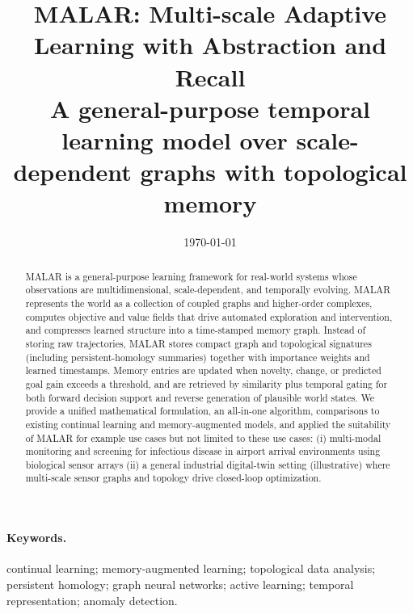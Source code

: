 \documentclass[11pt,english]{article}
\title{\textbf{MALAR}: Multi-scale Adaptive Learning with Abstraction and Recall\\
\large A general-purpose temporal learning model over scale-dependent graphs with topological memory}
\date {\today}
\theoremstyle{remark}
\begin{document}
\maketitle

\begin{abstract}
MALAR is a general-purpose learning framework for real-world systems whose observations are multidimensional,
scale-dependent, and temporally evolving. MALAR represents the world as a collection of coupled graphs and
higher-order complexes, computes objective and value fields that drive automated exploration and intervention,
and compresses learned structure into a time-stamped memory graph. Instead of storing raw trajectories,
MALAR stores compact graph and topological signatures (including persistent-homology summaries) together with
importance weights and learned timestamps. Memory entries are updated when novelty, change, or predicted goal
gain exceeds a threshold, and are retrieved by similarity plus temporal gating for both forward decision support
and reverse generation of plausible world states. We provide a unified mathematical formulation, an all-in-one
algorithm, comparisons to existing continual learning and memory-augmented models, and applied the suitability of MALAR for example use cases but not limited to these use cases: (i) multi-modal monitoring and screening for infectious disease in airport arrival environments using biological
sensor arrays (ii) a general industrial digital-twin setting (illustrative) where multi-scale
sensor graphs and topology drive closed-loop optimization.
\end{abstract}

\paragraph{Keywords.} continual learning; memory-augmented learning; topological data analysis; persistent homology; graph neural networks; active learning; temporal representation; anomaly detection.
\end{document}
